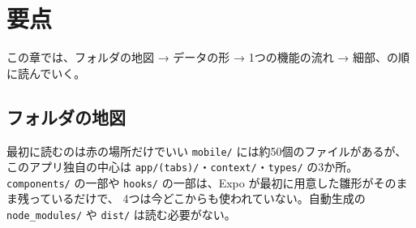 \section{要点}

この章では、フォルダの地図 → データの形 → 1つの機能の流れ → 細部、の順に読んでいく。

\subsection{フォルダの地図}

\begin{kkbadgepoint}[要点]{最初に読むのは赤の場所だけでいい}
  \texttt{mobile/} には約50個のファイルがあるが、このアプリ独自の中心は
  \texttt{app/(tabs)/}・\texttt{context/}・\texttt{types/} の3か所。
  \texttt{components/} の一部や \texttt{hooks/} の一部は、Expo が最初に用意した雛形がそのまま残っているだけで、
  4つは今どこからも使われていない。自動生成の \texttt{node\_modules/} や \texttt{dist/} は読む必要がない。
\end{kkbadgepoint}


